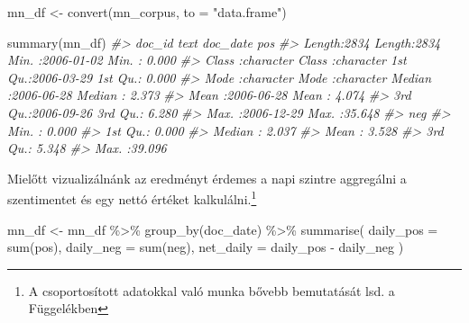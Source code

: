 \documentclass[
]{book}
\newenvironment{Shaded}{\begin{snugshade}}{\end{snugshade}}
\newcommand{\AttributeTok}[1]{\textcolor[rgb]{0.77,0.63,0.00}{#1}}
\newcommand{\CommentTok}[1]{\textcolor[rgb]{0.56,0.35,0.01}{\textit{#1}}}
\newcommand{\FunctionTok}[1]{\textcolor[rgb]{0.00,0.00,0.00}{#1}}
\newcommand{\NormalTok}[1]{#1}
\newcommand{\OtherTok}[1]{\textcolor[rgb]{0.56,0.35,0.01}{#1}}
\newcommand{\SpecialCharTok}[1]{\textcolor[rgb]{0.00,0.00,0.00}{#1}}
\newcommand{\StringTok}[1]{\textcolor[rgb]{0.31,0.60,0.02}{#1}}
\begin{document}
\begin{Shaded}
\begin{Highlighting}[]
\NormalTok{mn\_df }\OtherTok{\textless{}{-}} \FunctionTok{convert}\NormalTok{(mn\_corpus, }\AttributeTok{to =} \StringTok{"data.frame"}\NormalTok{)}


\FunctionTok{summary}\NormalTok{(mn\_df)}
\CommentTok{\#\textgreater{}     doc\_id              text              doc\_date               pos        }
\CommentTok{\#\textgreater{}  Length:2834        Length:2834        Min.   :2006{-}01{-}02   Min.   : 0.000  }
\CommentTok{\#\textgreater{}  Class :character   Class :character   1st Qu.:2006{-}03{-}29   1st Qu.: 0.000  }
\CommentTok{\#\textgreater{}  Mode  :character   Mode  :character   Median :2006{-}06{-}28   Median : 2.373  }
\CommentTok{\#\textgreater{}                                        Mean   :2006{-}06{-}28   Mean   : 4.074  }
\CommentTok{\#\textgreater{}                                        3rd Qu.:2006{-}09{-}26   3rd Qu.: 6.280  }
\CommentTok{\#\textgreater{}                                        Max.   :2006{-}12{-}29   Max.   :35.648  }
\CommentTok{\#\textgreater{}       neg        }
\CommentTok{\#\textgreater{}  Min.   : 0.000  }
\CommentTok{\#\textgreater{}  1st Qu.: 0.000  }
\CommentTok{\#\textgreater{}  Median : 2.037  }
\CommentTok{\#\textgreater{}  Mean   : 3.528  }
\CommentTok{\#\textgreater{}  3rd Qu.: 5.348  }
\CommentTok{\#\textgreater{}  Max.   :39.096}
\end{Highlighting}
\end{Shaded}

Mielőtt vizualizálnánk az eredményt érdemes a napi szintre aggregálni a
szentimentet és egy nettó értéket kalkulálni.\footnote{A csoportosított
  adatokkal való munka bővebb bemutatását lsd. a Függelékben}

\begin{Shaded}
\begin{Highlighting}[]
\NormalTok{mn\_df }\OtherTok{\textless{}{-}}\NormalTok{ mn\_df }\SpecialCharTok{\%\textgreater{}\%}
  \FunctionTok{group\_by}\NormalTok{(doc\_date) }\SpecialCharTok{\%\textgreater{}\%}
  \FunctionTok{summarise}\NormalTok{(}
    \AttributeTok{daily\_pos =} \FunctionTok{sum}\NormalTok{(pos),}
    \AttributeTok{daily\_neg =} \FunctionTok{sum}\NormalTok{(neg),}
    \AttributeTok{net\_daily =}\NormalTok{ daily\_pos }\SpecialCharTok{{-}}\NormalTok{ daily\_neg}
\NormalTok{  )}
\end{Highlighting}
\end{Shaded}
\end{document}
